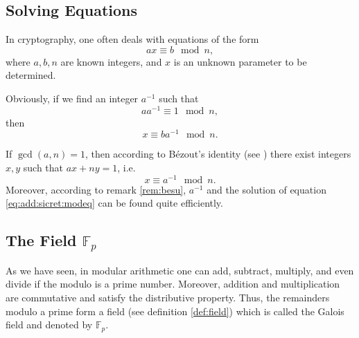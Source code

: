 \subsection{Solving Equations}
\label{sec:add:discretmath:mod:equationsolve}
In cryptography, one often deals with equations of the form
\begin{equation}
a x \equiv b \mod n,
\label{eq:add:sicret:modeq}
\end{equation}
where $a, b, n$ are known integers, and $x$ is an unknown parameter
to be determined.

Obviously, if we find an integer $a^{-1}$ such that 
\[
a a^{-1} \equiv 1 \mod n,
\]
then
\[
x \equiv b a^{-1} \mod n.
\]

If $\gcd(a, n) = 1$, then according to
Bézout's identity (see ) 
there exist integers $x, y$ such that $a x + n y = 1$, i.e. 
\[
x \equiv a^{-1} \mod n.
\]
Moreover, according to remark \ref{rem:besu}, $a^{-1}$ and
the solution of equation \eqref{eq:add:sicret:modeq} can be found
quite efficiently.

\subsection{The Field $\mathbb{F}_p$}
\label{sec:add:diskretmath:mod:fp}
As we have seen, in modular arithmetic one can add, subtract,
multiply, and even divide if the modulo is a prime number.
Moreover, addition and multiplication are commutative and satisfy
the distributive property. Thus, the remainders modulo a prime
form a field (see definition \ref{def:field}) which 
is called the Galois field and denoted by $\mathbb{F}_p$.

